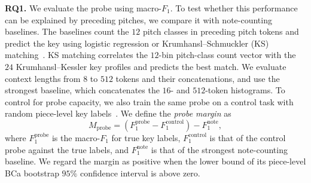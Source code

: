 \documentclass{article}
\begin{document}
\noindent\textbf{RQ1.}
We evaluate the probe using macro-$F_1$.
To test whether this performance can be explained by preceding pitches, we compare it with note-counting baselines.
The baselines count the $12$ pitch classes in preceding pitch tokens and predict the key using logistic regression or
Krumhansl--Schmuckler (KS) matching~\cite{krumhansl1982,krumhansl1990}.
KS matching correlates the $12$-bin pitch-class count vector with the $24$ Krumhansl--Kessler key profiles and predicts the best match.
We evaluate context lengths from $8$ to $512$ tokens and their concatenations, and use the strongest baseline, which concatenates the $16$- and $512$-token histograms.
To control for probe capacity, we also train the same probe on a control task with random piece-level key labels~\cite{hewitt2019control}.
We define the \emph{probe margin} as
\begin{equation}
M_{\mathrm{probe}}
=
\left(F_1^{\mathrm{probe}}-F_1^{\mathrm{control}}\right)
-F_1^{\mathrm{note}},
\label{eq:probe-margin}
\end{equation}
where $F_1^{\mathrm{probe}}$ is the macro-$F_1$ for true key labels, $F_1^{\mathrm{control}}$ is that of the control probe against the true labels, and $F_1^{\mathrm{note}}$ is that of the strongest note-counting baseline.
We regard the margin as positive when the lower bound of its piece-level BCa bootstrap $95\%$ confidence interval is above zero.
\end{document}
